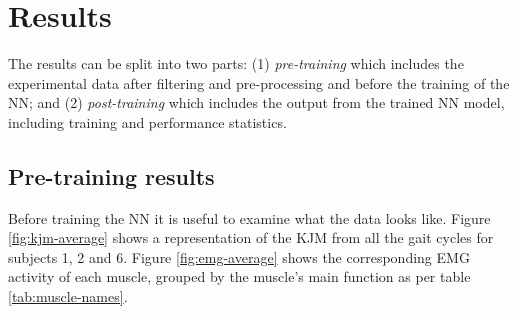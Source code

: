 \documentclass[../main.tex]{subfiles}
\begin{document}
\chapter{Results}
\label{sec:results}
The results can be split into two parts: (1) \textit{pre-training} which includes the experimental data after filtering and pre-processing and before the training of the \ac{NN}; and (2) \textit{post-training} which includes the output from the trained \ac{NN} model, including training and performance statistics.

\section{Pre-training results}
\label{sec:results_pre-training-results}
Before training the \ac{NN} it is useful to examine what the data looks like.
Figure \ref{fig:kjm-average} shows a representation of the \ac{KJM} from all the gait cycles for subjects 1, 2 and 6. 
Figure \ref{fig:emg-average} shows the corresponding \ac{EMG} activity of each muscle, grouped by the muscle's main function as per table \ref{tab:muscle-names}.
\end{document}
